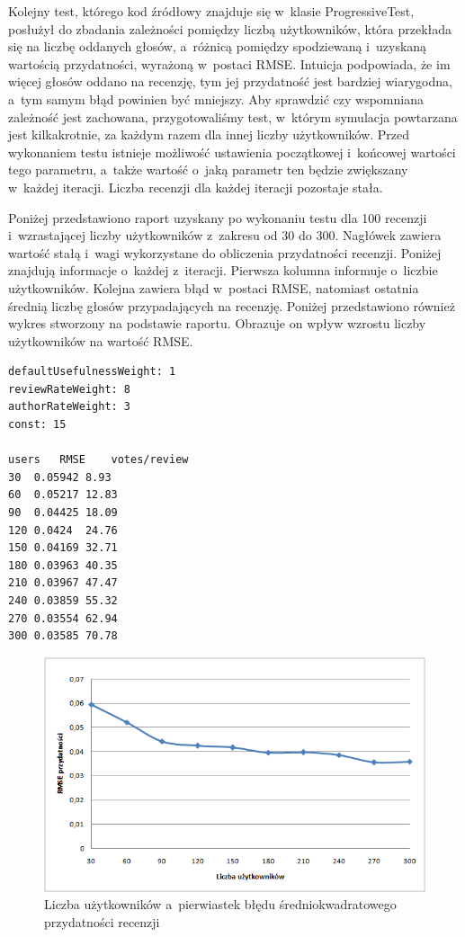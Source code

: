 Kolejny test, którego kod źródłowy znajduje się w~klasie ProgressiveTest, posłużył do zbadania zależności pomiędzy liczbą użytkowników, która przekłada się na liczbę oddanych głosów, a~różnicą pomiędzy spodziewaną i~uzyskaną wartością przydatności, wyrażoną w~postaci RMSE. Intuicja podpowiada, że im więcej głosów oddano na recenzję, tym jej przydatność jest bardziej wiarygodna, a~tym samym błąd powinien być mniejszy. Aby sprawdzić czy wspomniana zależność jest zachowana, przygotowaliśmy test, w~którym symulacja powtarzana jest kilkakrotnie, za każdym razem dla innej liczby użytkowników. Przed wykonaniem testu istnieje możliwość ustawienia początkowej i~końcowej wartości tego parametru, a~także wartość o~jaką parametr ten będzie zwiększany w~każdej iteracji. Liczba recenzji dla każdej iteracji pozostaje stała.


Poniżej przedstawiono raport uzyskany po wykonaniu testu dla 100 recenzji i~wzrastającej liczby użytkowników z~zakresu od 30 do 300. Nagłówek zawiera wartość stałą i~wagi wykorzystane do obliczenia przydatności recenzji. Poniżej znajdują informacje o~każdej z~iteracji. Pierwsza kolumna informuje o~liczbie użytkowników. Kolejna zawiera błąd w~postaci RMSE, natomiast ostatnia średnią liczbę głosów przypadających na recenzję. Poniżej przedstawiono również wykres stworzony na podstawie raportu. Obrazuje on wpływ wzrostu liczby użytkowników na wartość RMSE.

\begin{lstlisting}
defaultUsefulnessWeight: 1
reviewRateWeight: 8
authorRateWeight: 3
const: 15

users	RMSE	votes/review	
30	0.05942	8.93
60	0.05217	12.83
90	0.04425	18.09
120	0.0424	24.76
150	0.04169	32.71
180	0.03963	40.35
210	0.03967	47.47
240	0.03859	55.32
270	0.03554	62.94
300	0.03585	70.78
\end{lstlisting}

\begin{figure}[h]
	\centering
	\includegraphics[width=\textwidth, keepaspectratio=true]{images/ProgressiveTest.png}
	\caption{Liczba użytkowników a~pierwiastek błędu średniokwadratowego przydatności recenzji}
\end{figure}


